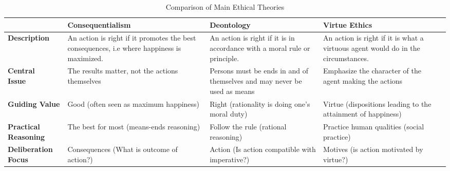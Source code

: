 \documentclass[twocolumn]{article}
\begin{document}
%

\begin{table*}[t]
\centering
\caption{Comparison of Main Ethical Theories}\label{table:ethics}
\begin{tabular}{|M{1.8cm}|M{4.8cm}|M{4.8cm}|M{4.8cm}|N} \hline
&\textbf{Consequentialism}&\textbf{Deontology}&\textbf{Virtue Ethics}&\\[10pt] \hline
\textbf{Description}& An action is right if it promotes the best consequences, i.e where happiness is maximized.& An action is right if it is in accordance with a moral rule or principle. %
 & An action is right if it is what a virtuous agent would do in the circumstances.  &\\[10pt] \hline
\textbf{Central \newline Issue} & The results matter, not the actions themselves & Persons must be ends in and of themselves and may never be used as means & Emphasize the character of the agent making the actions &\\[10pt] \hline
\textbf{Guiding Value}& Good (often seen as maximum happiness) & Right (rationality is doing one's moral duty) & Virtue (dispositions leading to the attainment of happiness) &\\[10pt] \hline
\textbf{Practical \newline Reasoning} & The best for most (means-ends reasoning)& Follow the rule 
(rational reasoning) & Practice human qualities (social practice)&\\[10pt] \hline
\textbf{Deliberation Focus} & Consequences (What is outcome of action?) & Action (Is action compatible with imperative?) & Motives (is action motivated by virtue?) &\\[10pt] \hline
\end{tabular}
\end{table*}
\end{document}
